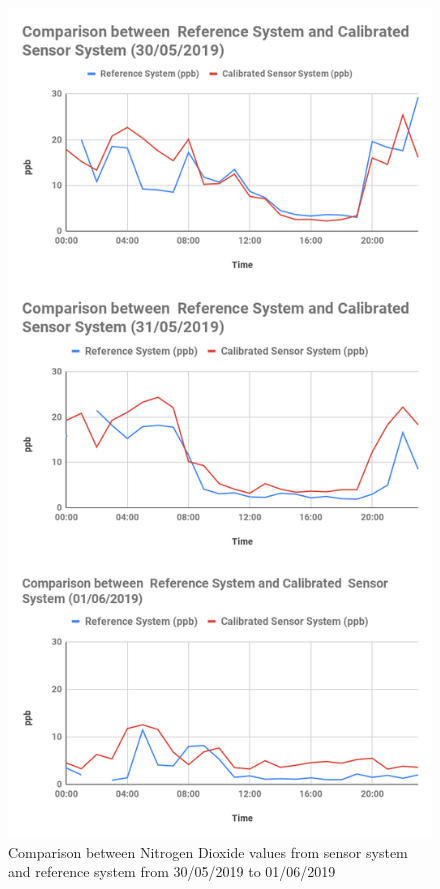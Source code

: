 \begin{figure}[h]
  \begin{center}
  \includegraphics[scale=0.45]{images/figure81no.png}
  \end{center}
  \caption{Comparison between Nitrogen Dioxide values from sensor system and reference system from 30/05/2019 to 01/06/2019}
\label{Nitrogen}

\end{figure}
\clearpage

